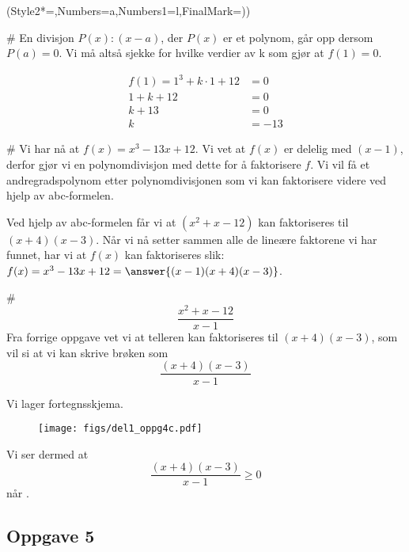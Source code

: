 \begin{easylist}[enumerate]
	\ListProperties(Style2*=,Numbers=a,Numbers1=l,FinalMark={)})
	
	# En divisjon $P(x) : (x-a)$, der $P(x)$ er et polynom, går opp dersom $P(a) = 0$. Vi må altså sjekke for hvilke verdier av k som gjør at $f(1)= 0$.\newline
	
	\begin{equation*}
		\begin{aligned}
		f(1) = 1^3 + k \cdot 1 + 12 &= 0 \\
		1+k+12 & =0 \\
		k + 13 & = 0 \\
		k & =  -13
		\end{aligned}
	\end{equation*}
	
	# Vi har nå at $f(x) = x^3 - 13x + 12$. Vi vet at $f(x)$ er delelig med $(x-1)$, derfor gjør vi en polynomdivisjon med dette for å faktorisere $f$. Vi vil få et andregradspolynom etter polynomdivisjonen som vi kan faktorisere videre ved hjelp av abc-formelen. \newline
	 \\ \newline
	
	Ved hjelp av abc-formelen får vi at $(x^2 + x -12 )$ kan faktoriseres til $(x+4)(x-3)$. Når vi nå setter sammen alle de lineære faktorene vi har funnet, har vi at $f(x)$ kan faktoriseres slik: $f(x) = x^3 - 13x + 12 = \answer{(x-1)(x+4)(x-3)}$.
	
	# $$\frac{x^2 + x -12}{x-1}$$
	Fra forrige oppgave vet vi at telleren kan faktoriseres til $(x+4)(x-3)$, som vil si at vi kan skrive brøken som $$\frac{(x+4)(x-3)}{x-1}$$
	
	Vi lager fortegnsskjema. 
	\begin{figure}[ht!]
		\centering
		\texttt{[image: figs/del1\_oppg4c.pdf]}
		\label{fig:del1_oppg4c}
	\end{figure}
	
	Vi ser dermed at $$\frac{(x+4)(x-3)}{x-1} \geq 0$$ når .
	
\end{easylist}

\subsection*{Oppgave 5}


